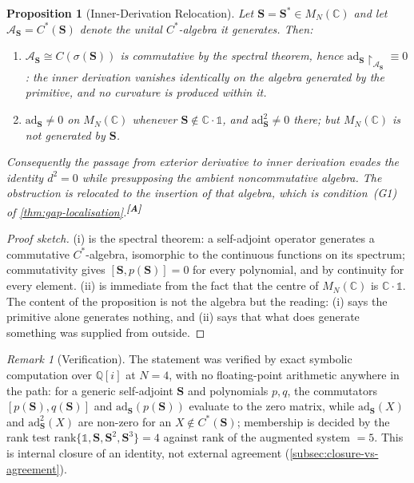 \documentclass[12pt,a4paper,twoside]{article}
\theoremstyle{plain}
\newtheorem{proposition}[theorem]{Proposition}
\theoremstyle{definition}
\theoremstyle{remark}
\newtheorem{remark}[theorem]{Remark}
\newcommand{\catmark}[1]{\textsuperscript{\textsf{\textbf{[#1]}}}}
\begin{document}
\begin{proposition}[Inner-Derivation Relocation]
\label{prop:inner-derivation}
Let $\mathbf S = \mathbf S^{\ast} \in M_N(\mathbb C)$ and let
$\mathcal A_{\mathbf S} = C^{\ast}(\mathbf S)$ denote the unital
$C^{\ast}$-algebra it generates. Then:
\begin{enumerate}[label=(\roman*),leftmargin=2.2em,itemsep=0.15em]
\item $\mathcal A_{\mathbf S} \cong C(\sigma(\mathbf S))$ is commutative
by the spectral theorem, hence $\mathrm{ad}_{\mathbf
S}\!\restriction_{\mathcal A_{\mathbf S}} \equiv 0$: the inner derivation
vanishes identically on the algebra generated by the primitive, and no
curvature is produced within it.
\item $\mathrm{ad}_{\mathbf S} \neq 0$ on $M_N(\mathbb C)$ whenever
$\mathbf S \notin \mathbb C\!\cdot\!\mathbb 1$, and
$\mathrm{ad}_{\mathbf S}^{2} \neq 0$ there; but $M_N(\mathbb C)$ is not
generated by $\mathbf S$.
\end{enumerate}
Consequently the passage from exterior derivative to inner derivation
evades the identity $d^2=0$ while presupposing the ambient noncommutative
algebra. The obstruction is relocated to the insertion of that algebra,
which is condition~(G1) of \cref{thm:gap-localisation}.\catmark{A}
\end{proposition}

\begin{proof}[Proof sketch]
(i) is the spectral theorem: a self-adjoint operator generates a
commutative $C^{\ast}$-algebra, isomorphic to the continuous functions on
its spectrum; commutativity gives $[\mathbf S, p(\mathbf S)] = 0$ for
every polynomial, and by continuity for every element. (ii) is immediate
from the fact that the centre of $M_N(\mathbb C)$ is $\mathbb
C\!\cdot\!\mathbb 1$. The content of the proposition is not the algebra
but the reading: (i) says the primitive alone generates nothing, and (ii)
says that what does generate something was supplied from outside.
\end{proof}

\begin{remark}[Verification]
\label{rem:inner-derivation-check}
The statement was verified by exact symbolic computation over
$\mathbb Q[i]$ at $N=4$, with no floating-point arithmetic anywhere in
the path: for a generic self-adjoint $\mathbf S$ and polynomials $p, q$,
the commutators $[p(\mathbf S), q(\mathbf S)]$ and
$\mathrm{ad}_{\mathbf S}(p(\mathbf S))$ evaluate to the zero matrix,
while $\mathrm{ad}_{\mathbf S}(X)$ and $\mathrm{ad}_{\mathbf S}^{2}(X)$
are non-zero for an $X \notin C^{\ast}(\mathbf S)$; membership is decided
by the rank test $\mathrm{rank}\{\mathbb 1, \mathbf S, \mathbf S^2,
\mathbf S^3\} = 4$ against $\mathrm{rank}$ of the augmented system $= 5$.
This is internal closure of an identity, not external agreement
(\cref{subsec:closure-vs-agreement}).
\end{remark}
\end{document}
